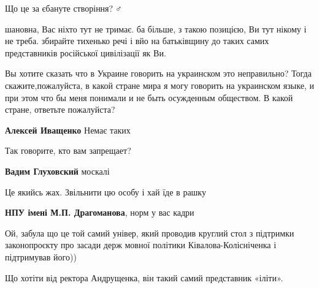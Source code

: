\begin{itemize}
Що це за єбануте створіння?🤦♂️


шановна, Вас ніхто тут не тримає. ба більше, з такою позицією, Ви тут нікому і
не треба. збирайте тихенько речі і вйо на батьківщину до таких самих
представників російської цивілізації як Ви.




Вы хотите сказать что в Украине говорить на украинском это неправильно? Тогда
скажите,пожалуйста, в какой стране мира я могу говорить на украинском языке, и
при этом что бы меня понимали и не быть осужденным обществом. В какой стране,
ответьте пожалуйста?

\begin{itemize}

\textbf{Алексей Иващенко} Немає таких 🙁


Так говорите, кто вам запрещает?


\textbf{Вадим Глуховский} москалі
\end{itemize}


Це якийсь жах. Звільнити цю особу і хай їде в рашку


\textbf{НПУ імені М.П. Драгоманова}, норм у вас кадри 🥴

Ой, забула що це той самий універ, який проводив круглий стол з підтримки
законопроєкту про засади держ мовної політики Ківалова-Колісніченка і
підтримував його))

Що хотіти від ректора Андрущенка, він такий самий представник «іліти».


\end{itemize}
